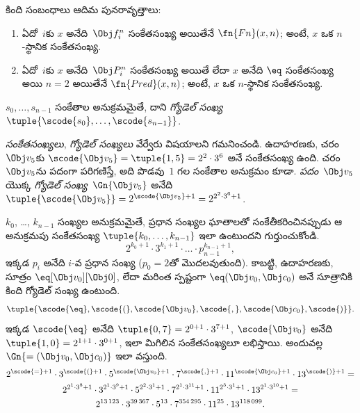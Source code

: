 \documentclass[../../../include/open-logic-section]{subfiles}
\begin{document}
\begin{prop}
కింది సంబంధాలు ఆదిమ పునరావృత్తాలు:
\begin{enumerate}
\item ఏదో~$i$కు $x$ అనేది~$\Obj f^n_i$ సంకేతసంఖ్య అయితేనే
  $\fn{Fn}(x, n)$; అంటే, $x$ ఒక $n$-స్థానిక
   సంకేతసంఖ్య.
\item ఏదో~$i$కు $x$ అనేది~$\Obj P^n_i$ సంకేతసంఖ్య అయితే లేదా $x$ అనేది
  $\eq$ సంకేతసంఖ్య అయి $n = 2$ అయితేనే $\fn{Pred}(x, n)$; అంటే, $x$ ఒక
  $n$-స్థానిక  సంకేతసంఖ్య.
\end{enumerate}
\end{prop}

\begin{defn}
$s_0, \dots, s_{n-1}$ సంకేతాల అనుక్రమమైతే, దాని \emph{గ్యోడెల్ సంఖ్య}
$\tuple{\scode{s_0}, \dots, \scode{s_{n-1}}}$.
\end{defn}

\begin{explain}
\emph{సంకేతసంఖ్యలు}, \emph{గ్యోడెల్ సంఖ్యలు} వేర్వేరు విషయాలని గమనించండి.
ఉదాహరణకు, చరం~$\Obj v_5$కు $\scode{\Obj v_5} = \tuple{1, 5} =
2^2\cdot 3^6$ అనే సంకేతసంఖ్య ఉంది. చరం~$\Obj v_5$ను పదంగా పరిగణిస్తే, అది పొడవు~$1$ గల సంకేతాల అనుక్రమం కూడా. \emph{పదం}~$\Obj v_5$ యొక్క
\emph{గ్యోడెల్ సంఖ్య}~$\Gn{\Obj v_5}$ అనేది $\tuple{\scode{\Obj v_5}} =
2^{\scode{\Obj v_5} + 1} = 2^{2^2\cdot 3^6 + 1}$.
\end{explain}

\begin{ex}
$k_0$, \dots, $k_{n-1}$ సంఖ్యల అనుక్రమమైతే, ప్రధాన సంఖ్యల ఘాతాలతో
సంకేతీకరించినప్పుడు ఆ అనుక్రమపు సంకేతసంఖ్య $\tuple{k_0, \dots, k_{n-1}}$ ఇలా
ఉంటుందని గుర్తుంచుకోండి.
\[
2^{k_0+1}\cdot3^{k_1+1}\cdot \dots \cdot p_{n-1}^{k_{n-1}+1},
\]
ఇక్కడ $p_i$ అనేది $i$-వ ప్రధాన సంఖ్య ($p_0 = 2$తో మొదలవుతుంది). కాబట్టి,
ఉదాహరణకు, సూత్రం $\eq[\Obj v_0][\Obj 0]$, లేదా మరింత స్పష్టంగా
${\eq}(\Obj v_0,\Obj c_0)$ అనే సూత్రానికి కింది గ్యోడెల్ సంఖ్య ఉంటుంది.
\[
\tuple{\scode{\eq},\scode{(},\scode{\Obj v_0},\scode{,}, \scode{\Obj
    c_0},\scode{)}}.
\]
ఇక్కడ $\scode{\eq}$ అనేది $\tuple{0,7} = 2^{0+1}\cdot
3^{7+1}$, $\scode{\Obj v_0}$ అనేది $\tuple{1,0} = 2^{1+1}\cdot3^{0+1}$,
ఇలా మిగిలిన సంకేతసంఖ్యలూ లభిస్తాయి. అందువల్ల $\Gn{=(\Obj v_0,\Obj c_0)}$ ఇలా వస్తుంది.
\begin{multline*}
2^{\scode{=} + 1}\cdot 3^{\scode{(}+1}\cdot 5^{\scode{\Obj v_0}+1}
\cdot 7^{\scode{,} + 1} \cdot 11^{\scode{\Obj c_0}+1} \cdot
13^{\scode{)}+1} = \\
2^{2^1\cdot 3^8 + 1}\cdot 3^{2^1\cdot 3^9+1}\cdot 5^{2^2\cdot 3^1+1}
\cdot 7^{2^1\cdot 3^{11} + 1} \cdot 11^{2^3\cdot3^1+1} \cdot
13^{2^1\cdot3^{10}+1} = \\
2^{13\,123}\cdot 3^{39\,367}\cdot 5^{13}\cdot 7^{354\,295}\cdot11^{25}\cdot13^{118\,099}.
\end{multline*}
\end{ex}
\end{document}
